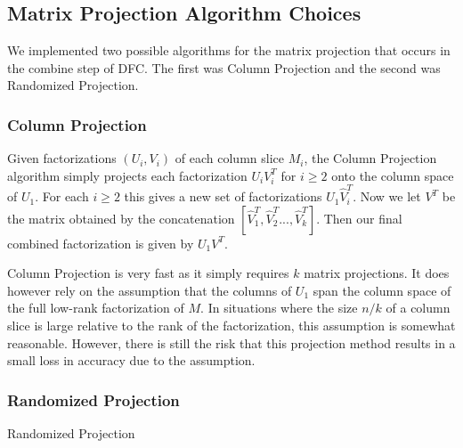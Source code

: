 \subsection{Matrix Projection Algorithm Choices}
We implemented two possible algorithms for the matrix projection that occurs in the combine step of DFC. The first was Column Projection and the second was Randomized Projection.

\subsubsection{Column Projection}
Given factorizations $(U_i,V_i)$ of each column slice $M_i$, the Column Projection algorithm simply projects each factorization $U_i V_i^T$ for $i \geq 2$ onto the column space of $U_1$. For each $i \geq 2$ this gives a new set of factorizations $U_1 \hat{V}_i^T$. Now we let $V^T$ be the  matrix obtained by the concatenation $[\hat{V}_1^T, \hat{V}_2^T..., \hat{V}_k^T]$. Then our final combined factorization is given by $U_1 V^T$.

Column Projection is very fast as it simply requires $k$ matrix projections. It does however rely on the assumption that the columns of $U_1$ span the column space of the full low-rank factorization of $M$. In situations where the size $n/k$ of a column slice is large relative to the rank of the factorization, this assumption is somewhat reasonable. However, there is still the risk that this projection method results in a small loss in accuracy due to the assumption.

\subsubsection{Randomized Projection}
Randomized Projection